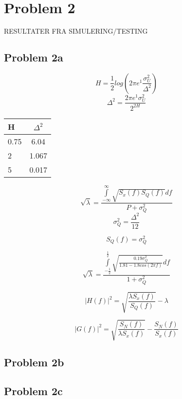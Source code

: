 \chapter{Problem 2}
RESULTATER FRA SIMULERING/TESTING

\section{Problem 2a}

	\begin{equation}
		H=\frac{1}{2}log(2\pi e^1\frac{\sigma ^2 _U}{\Delta ^2})
	\end{equation}
	\begin{equation}
		\Delta ^2=\frac{2\pi e^1\sigma ^2 _U}{2^{2H}}
	\end{equation}
	
	\begin{table}
		\centering
		\begin{tabular}{| l | c |} \hline
			H & $\Delta^2$ \\ \hline
			0.75 & 6.04 \\ \hline
			2 & 1.067 \\ \hline
			5 & 0.017 \\ \hline
		\end{tabular}
	\end{table}
	
	\begin{equation}
		\sqrt{\lambda}=\frac{\int\limits_{-\infty}^{\infty}\sqrt{S_x(f)S_Q(f)}df}{P+\sigma^2_Q}
	\end{equation}
	\begin{equation}
		\sigma^2_Q=\frac{\Delta^2}{12}
	\end{equation}
	
	\begin{equation}
		S_Q(f)=\sigma^2_Q
	\end{equation}
	

	\begin{equation}
		\sqrt{\lambda}=\frac{\int\limits_{-\frac{1}{2}}^{\frac{1}{2}}\sqrt{\frac{0.19\sigma^2_Q}{1.81-1.8cos(2\pi f)}}df}{1+\sigma^2_Q}
	\end{equation}
	
	\begin{equation}
		|H(f)|^2=\sqrt{\frac{\lambda S_x(f)}{S_Q(f)}}-\lambda
	\end{equation}
	
	\begin{equation}
		|G(f)|^2=\sqrt{\frac{S_N(f)}{\lambda S_x(f)}}-\frac{S_N(f)}{S_x(f)}
	\end{equation}
	
	

\section{Problem 2b}

\section{Problem 2c}
